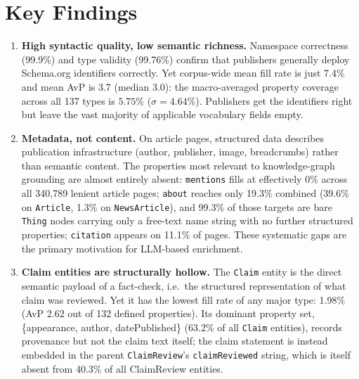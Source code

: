 \documentclass[11pt,a4paper]{article}
\begin{document}
\section{Key Findings}
\label{sec:findings}

\begin{enumerate}[leftmargin=1.5em]

\item \textbf{High syntactic quality, low semantic richness.}
  Namespace correctness (99.9\%) and type validity (99.76\%) confirm that
  publishers generally deploy Schema.org identifiers correctly.
  Yet corpus-wide mean fill rate is just 7.4\% and mean AvP is 3.7
  (median 3.0): the macro-averaged property coverage across all 137 types
  is $5.75\%$ ($\sigma = 4.64\%$).  Publishers get the identifiers right
  but leave the vast majority of applicable vocabulary fields empty.

\item \textbf{Metadata, not content.}
  On article pages, structured data describes publication infrastructure
  (author, publisher, image, breadcrumbs) rather than semantic content.
  The properties most relevant to knowledge-graph grounding are almost
  entirely absent: \texttt{mentions} fills at effectively 0\% across all
  340{,}789 lenient article pages; \texttt{about} reaches only 19.3\%
  combined (39.6\% on \texttt{Article}, 1.3\% on \texttt{NewsArticle}),
  and 99.3\% of those targets are bare \texttt{Thing} nodes carrying only
  a free-text name string with no further structured properties;
  \texttt{citation} appears on 11.1\% of pages.
  These systematic gaps are the primary motivation for LLM-based enrichment.

\item \textbf{Claim entities are structurally hollow.}
  The \texttt{Claim} entity is the direct semantic payload of a
  fact-check, i.e.\ the structured representation of what claim was reviewed.
  Yet it has the lowest fill rate of any major type: 1.98\% (AvP 2.62 out
  of 132 defined properties).  Its dominant property set,
  \{appearance, author, datePublished\} (63.2\% of all \texttt{Claim}
  entities), records provenance but not the claim text itself; the claim
  statement is instead embedded in the parent \texttt{ClaimReview}'s
  \texttt{claimReviewed} string, which is itself absent from 40.3\% of
  all ClaimReview entities.


\end{enumerate}
\end{document}
